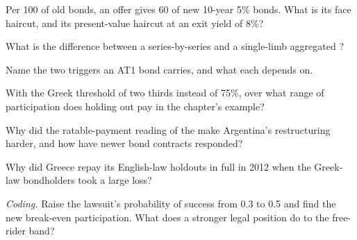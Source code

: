 \begin{exercise}[$\star$]\label{exo:m2:distressed-sovereign-and-bank-capital-credit:1}
Per 100 of old bonds, an offer gives 60 of new 10-year 5\% bonds. What is its face
haircut, and its present-value haircut at an exit yield of 8\%?
\end{exercise}

\begin{exercise}[$\star$]\label{exo:m2:distressed-sovereign-and-bank-capital-credit:2}
What is the difference between a series-by-series and a single-limb aggregated
?
\end{exercise}

\begin{exercise}[$\star$]\label{exo:m2:distressed-sovereign-and-bank-capital-credit:3}
Name the two triggers an AT1 bond carries, and what each depends on.
\end{exercise}

\begin{exercise}[$\star\star$]\label{exo:m2:distressed-sovereign-and-bank-capital-credit:4}
With the Greek threshold of two thirds instead of 75\%, over what range of participation
does holding out pay in the chapter's example?
\end{exercise}

\begin{exercise}[$\star\star$]\label{exo:m2:distressed-sovereign-and-bank-capital-credit:5}
Why did the ratable-payment reading of the  make Argentina's
restructuring harder, and how have newer bond contracts responded?
\end{exercise}

\begin{exercise}[$\star\star$]\label{exo:m2:distressed-sovereign-and-bank-capital-credit:6}
Why did Greece repay its English-law holdouts in full in 2012 when the Greek-law
bondholders took a large loss?
\end{exercise}

\begin{exercise}[$\star\star\star$]\label{exo:m2:distressed-sovereign-and-bank-capital-credit:7}
\emph{Coding.} Raise the lawsuit's probability of success from 0.3 to 0.5 and find the
new break-even participation. What does a stronger legal position do to the free-rider
band?
\end{exercise}


